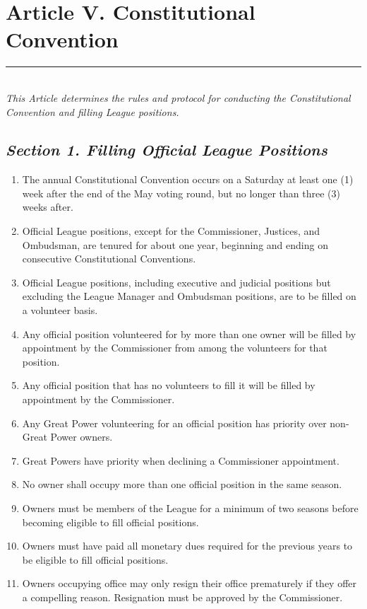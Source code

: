 \documentclass{article}
\begin{document}
\section{Article V. Constitutional Convention}
    \noindent\rule{\textwidth}{0.5pt}\\

    \textit{This Article determines the rules and protocol for conducting the Constitutional Convention and filling League positions.}
    \subsection{\textit{Section 1. Filling Official League Positions}}
    \begin{enumerate}[label=\Alph*)]
        \item The annual Constitutional Convention occurs on a Saturday at least one (1) week after the end of the May voting round, but no longer than three (3) weeks after.
        \item Official League positions, except for the Commissioner, Justices, and Ombudsman, are tenured for about one year, beginning and ending on consecutive Constitutional Conventions.
        \item Official League positions, including executive and judicial positions but excluding the League Manager and Ombudsman positions, are to be filled on a volunteer basis.
        \item Any official position volunteered for by more than one owner will be filled by appointment by the Commissioner from among the volunteers for that position.
        \item Any official position that has no volunteers to fill it will be filled by appointment by the Commissioner.
        \item Any Great Power volunteering for an official position has priority over non-Great Power owners.
        \item Great Powers have priority when declining a Commissioner appointment.
        \item No owner shall occupy more than one official position in the same season.
        \item Owners must be members of the League for a minimum of two seasons before becoming eligible to fill official positions.
        \item Owners must have paid all monetary dues required for the previous years to be eligible to fill official positions.
        \item Owners occupying office may only resign their office prematurely if they offer a compelling reason. Resignation must be approved by the Commissioner.
    \end{enumerate}
\end{document}

